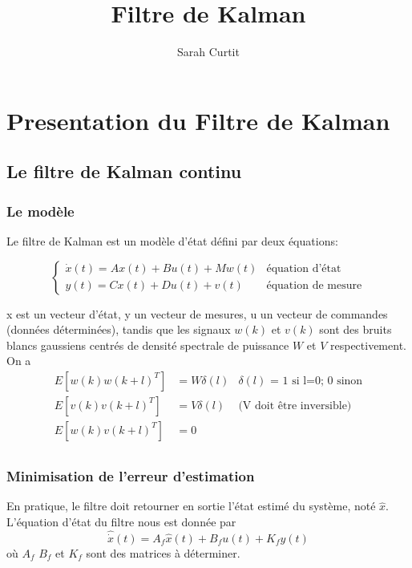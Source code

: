 \documentclass[12pt,twoside,a4paper]{article}
\title{Filtre de Kalman}
\author{Sarah Curtit}
\date{}
\begin{document}
	\maketitle
	
\section{Presentation du Filtre de Kalman}

\subsection{Le filtre de Kalman continu}

\subsubsection{Le modèle}
	
Le filtre de Kalman est un modèle d'état défini par deux équations: 

$$
\left\{ 
\begin{array}{ll}
        \dot{x}(t) = A x(t)  + B u(t) +M w(t)  & \text{équation d'état}  \\
        y(t) = C x(t) + Du(t) + v(t) & \text{équation de mesure} 
\end{array}
\right.
$$



x est un vecteur d'état, y un vecteur de mesures, u un vecteur de commandes (données déterminées), tandis que les signaux $w(k)$ et $v(k)$ sont des bruits blancs gaussiens centrés de densité spectrale de puissance $W$ et $V$ respectivement. On a 
$$
\begin{array}{lll}
E[w(k) w(k+l)^T ] &= W\delta(l) & \delta(l) \text{ = 1 si l=0; 0 sinon} \\
E[v(k) v(k+l)^T ] &= V \delta(l) & \text{(V doit être inversible)}\\
E[w(k) v(k+l)^T ] &= 0 & \\
\end{array}
$$

\subsubsection{Minimisation de l'erreur d'estimation} 

En pratique, le filtre doit retourner en sortie l'état estimé du système, noté $\hat{x}$.
L'équation d'état du filtre nous est donnée par 
$$ \hat{\dot{x}}(t) = A_f\hat{x}(t)+B_fu(t)+K_fy(t) $$
où $A_f$ $B_f$ et $K_f$ sont des matrices à déterminer. \\
\vspace{0.5cm}
\end{document}
